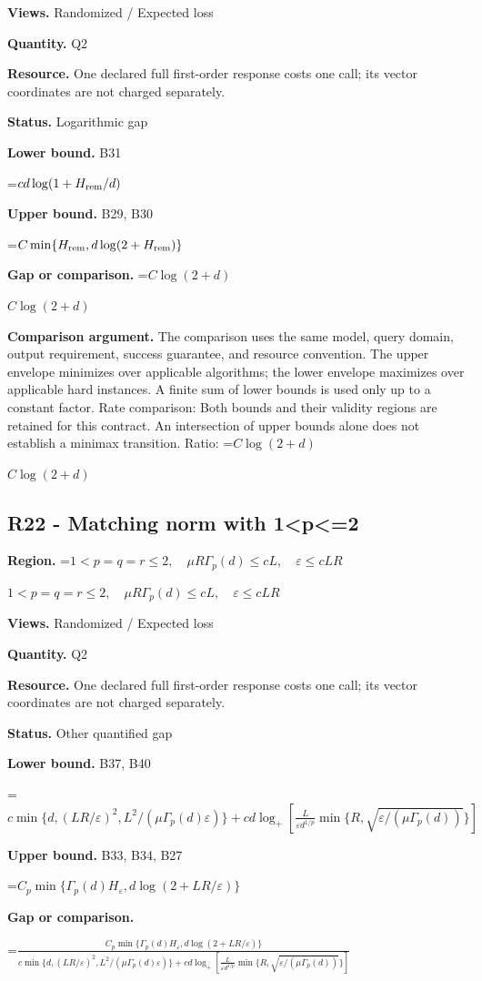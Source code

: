 \documentclass[10pt,a4paper]{article}
\newcommand{\AtlasMath}[1]{\par\begingroup\centering\setbox0=\hbox{$\displaystyle #1$}\ifdim\wd0>1.4\linewidth\typeout{ATLAS WIDE FORMULA: \the\wd0}\fi\ifdim\wd0>\linewidth\resizebox{\linewidth}{!}{\box0}\else\box0\fi\par\endgroup}
\newcommand{\AtlasInlineMath}[1]{\begingroup\setbox0=\hbox{$#1$}\ifdim\wd0>.4\linewidth\endgroup\AtlasMath{#1}\else\endgroup$#1$\fi}
\begin{document}
\textbf{Views.} Randomized / Expected loss

\textbf{Quantity.} Q2

\textbf{Resource.} One declared full first-order response costs one call; its vector coordinates are not charged separately.

\textbf{Status.} Logarithmic gap

\textbf{Lower bound.} B31

\AtlasMath{cd\log(1+H_{\rm rem}/d)}
\textbf{Upper bound.} B29, B30

\AtlasMath{C\min\{H_{\rm rem},d\log(2+H_{\rm rem})\}}
\textbf{Gap or comparison.} \AtlasInlineMath{C\log(2+d)}

\textbf{Comparison argument.} The comparison uses the same model, query domain, output requirement, success guarantee, and resource convention. The upper envelope minimizes over applicable algorithms; the lower envelope maximizes over applicable hard instances. A finite sum of lower bounds is used only up to a constant factor. Rate comparison: Both bounds and their validity regions are retained for this contract. An intersection of upper bounds alone does not establish a minimax transition. Ratio: \AtlasInlineMath{C\log(2+d)}

\subsection{R22 - Matching norm with 1<p<=2}
\textbf{Region.} \AtlasInlineMath{1<p=q=r\le2,\quad\mu R\Gamma_p(d)\le cL,\quad\varepsilon\le cLR}

\textbf{Views.} Randomized / Expected loss

\textbf{Quantity.} Q2

\textbf{Resource.} One declared full first-order response costs one call; its vector coordinates are not charged separately.

\textbf{Status.} Other quantified gap

\textbf{Lower bound.} B37, B40

\AtlasMath{c\min\{d,(LR/\varepsilon)^2,L^2/(\mu\Gamma_p(d)\varepsilon)\}+cd\log_+[\frac{L}{\varepsilon d^{1/p}}\min\{R,\sqrt{\varepsilon/(\mu\Gamma_p(d))}\}]}
\textbf{Upper bound.} B33, B34, B27

\AtlasMath{C_p\min\{\Gamma_p(d)H_\varepsilon,d\log(2+LR/\varepsilon)\}}
\textbf{Gap or comparison.} 
\AtlasMath{\frac{C_p\min\{\Gamma_p(d)H_\varepsilon,d\log(2+LR/\varepsilon)\}}{c\min\{d,(LR/\varepsilon)^2,L^2/(\mu\Gamma_p(d)\varepsilon)\}+cd\log_+[\frac{L}{\varepsilon d^{1/p}}\min\{R,\sqrt{\varepsilon/(\mu\Gamma_p(d))}\}]}}
\end{document}

